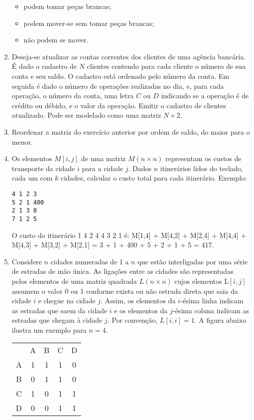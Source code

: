 \begin{enumerate}
\begin{itemize}
\item podem tomar peças brancas;
\item podem mover-se sem tomar peças brancas;
\item não podem se mover.
\end{itemize}

\item Deseja-se atualizar as contas correntes dos clientes de uma agência
bancária. É dado o cadastro de $N$ clientes contendo para cada cliente
o número de sua conta e seu saldo. O cadastro está ordenado pelo número 
da conta. Em seguida é dado o número de operações realizadas no dia, e, 
para cada operação, o número da conta, uma letra $C$ ou $D$ indicando se a
operação é de crédito ou débido, e o valor da operação. Emitir o cadastro
de clientes atualizado. Pode ser modelado como uma matriz $N \times 2$.


\item Reordenar a matriz do exercício anterior 
por ordem de saldo, do maior para o menor. 


\item Os elementos $M[i,j]$ de uma matriz $M (n \times n)$ 
representam os custos de
transporte da cidade $i$ para a cidade $j$. Dados $n$ itinerários lidos
do teclado, cada um
com $k$ cidades, calcular o custo total para cada itinerário. Exemplo:

\begin{verbatim}
4 1 2 3
5 2 1 400
2 1 3 8
7 1 2 5
\end{verbatim}

O custo do itinerário 1 4 2 4 4 3 2 1 é: 
M[1,4] + M[4,2] + M[2,4] + M[4,4] + M[4,3] + M[3,2] + M[2,1] =
3 + 1 + 400 + 5 + 2 + 1 + 5 = 417.


\item Considere $n$ cidades numeradas de 1 a $n$ que estão interligadas por
uma série de estradas de mão única. As ligações entre as cidades são 
representadas pelos elementos de uma matriz quadrada $L (n \times n)$ cujos
elementos L$[i,j]$ assumem o valor 0 ou 1 conforme exista ou não estrada
direta que saia da cidade $i$ e chegue na cidade $j$. Assim, os elementos
da $i$-ésima linha indicam as estradas que saem da cidade $i$ e os 
elementos da $j$-ésima coluna indicam as estradas que chegam à cidade $j$.
Por convenção, $L[i,i]=1$. A figura abaixo ilustra um exemplo para $n=4$.

\begin{center}
\begin{tabular}{ccccc}
  & A & B & C & D \\
A & 1 & 1 & 1 & 0 \\
B & 0 & 1 & 1 & 0 \\
C & 1 & 0 & 1 & 1 \\
D & 0 & 0 & 1 & 1 \\
\end{tabular}
\end{center}


\end{enumerate}
